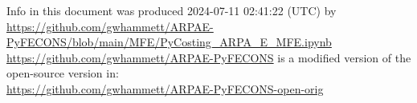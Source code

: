 {\footnotesize
\noindent
Info in this document was produced 2024-07-11 02:41:22 (UTC) by\\
\url{https://github.com/gwhammett/ARPAE-PyFECONS/blob/main/MFE/PyCosting_ARPA_E_MFE.ipynb}\\
\url{https://github.com/gwhammett/ARPAE-PyFECONS}
is a modified version of the open-source version in:\\
\url{https://github.com/gwhammett/ARPAE-PyFECONS-open-orig}
} %
